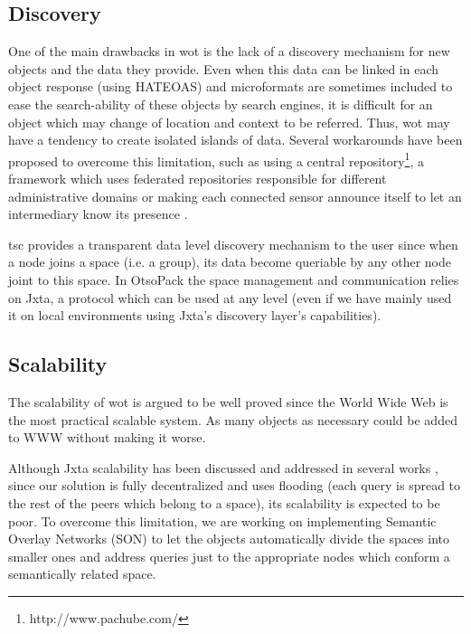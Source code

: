 \subsection{Discovery}
One of the main drawbacks in \ac{wot} is the lack of a discovery mechanism for new objects and the data they provide. Even when this data can be linked
in each object response (using HATEOAS) and microformats are sometimes included to ease the search-ability of these objects by search engines, it is difficult for an
object which may change of location and context to be referred. Thus, \ac{wot} may have a tendency to create isolated islands of data. Several workarounds
have been proposed to overcome this limitation, such as using a central repository\footnote{http://www.pachube.com/}, a framework which uses federated
repositories responsible for different administrative domains \citep{stirbu_towards_2008} or making each connected sensor announce itself to let an
intermediary know its presence \citep{kamilaris_smart_2010}.

\ac{tsc} provides a transparent data level discovery mechanism to the user since when a node joins a space (i.e. a group), its data become queriable by any other
node joint to this space. In OtsoPack the space management and communication relies on Jxta, a protocol which can be used at any level (even if we
have mainly used it on local environments using Jxta's discovery layer's capabilities).

\subsection{Scalability}
The scalability of \ac{wot} is argued to be well proved since the World Wide Web is the most practical scalable system. As many objects as
necessary could be added to WWW without making it worse. 

Although Jxta scalability has been discussed and addressed in several works \citep{antoniu_performance_2007}, since our solution is fully decentralized
and uses flooding (each query is spread to the rest of the peers which belong to a space), its scalability is expected to be poor. To overcome this limitation,
we are working on implementing Semantic Overlay Networks (SON) to let the objects automatically divide the spaces into smaller ones and address queries
just to the appropriate nodes which conform a semantically related space.

% 

